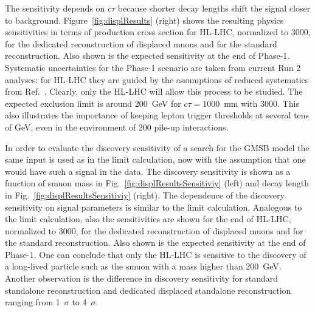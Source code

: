 The sensitivity depends on $c\tau$ because shorter decay lengths shift the signal closer to background. Figure~\ref{fig:displResults} (right) shows the resulting physics sensitivities in terms of production cross section for HL-LHC, normalized to 3000\fbinv, for the dedicated reconstruction of displaced muons and for the standard reconstruction. Also shown is the expected sensitivity at the end of Phase-1.
Systematic uncertainties for the Phase-1 scenario are taken from current Run 2 analyses: 
for HL-LHC they are guided by the assumptions of reduced systematics from Ref.~\cite{FTR-16-005}.
Clearly, only the HL-LHC will allow this process to be studied. 
The expected
exclusion limit is around 200~GeV for $c\tau = 1000$~mm with 3000\fbinv.
This also illustrates the importance
of keeping lepton trigger thresholds at several tens of GeV, even in the environment of 200 pile-up interactions.   

In order to evaluate the discovery sensitivity of a search for the GMSB model the same input is used as in the limit calculation, now with the assumption that one would have such a signal in the data. The discovery sensitivity is shown as a function of smuon mass in Fig.~\ref{fig:displResultsSensitiviy} (left) and decay length in Fig.~\ref{fig:displResultsSensitiviy} (right). The dependence of the discovery sensitivity on  signal parameters is similar to the limit calculation. Analogous to the limit calculation, also the sensitivities are shown for the end of HL-LHC, normalized to 3000\fbinv, for the dedicated reconstruction of displaced muons and for the standard reconstruction. Also shown is the expected sensitivity at the end of Phase-1. 
One can conclude that only the HL-LHC is sensitive to the discovery of a long-lived particle such as the smuon with a mass higher than $200$~GeV. Another observation is the difference in discovery sensitivity for standard standalone reconstruction and dedicated displaced standalone reconstruction ranging from 1~$\sigma$ to 4~$\sigma$.

